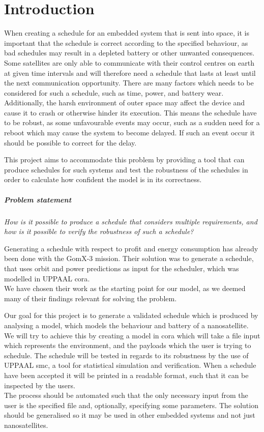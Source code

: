 \chapter{Introduction}\label{cha:intro}
When creating a schedule for an embedded system that is sent into space, it is important that the schedule is correct according to the specified behaviour, as bad schedules may result in a depleted battery or other unwanted consequences. 
Some satellites are only able to communicate with their control centres on earth at given time intervals and will therefore need a schedule that lasts at least until the next communication opportunity.
There are many factors which needs to be considered for such a schedule, such as time, power, and battery wear. 
Additionally, the harsh environment of outer space may affect the device and cause it to crash or otherwise hinder its execution.
This means the schedule have to be robust, as some unfavourable events may occur, such as a sudden need for a reboot which may cause the system to become delayed. If such an event occur it should be possible to correct for the delay.

This project aims to accommodate this problem by providing a tool that can produce schedules for such systems and test the robustness of the schedules in order to calculate how confident the model is in its correctness.

\paragraph{Problem statement}
\textit{How is it possible to produce a schedule that considers multiple requirements, and how is it possible to verify the robustness of such a schedule?}

Generating a schedule with respect to profit and energy consumption has already been done with the GomX-3 mission\cite{gomx3}. 
Their solution was to generate a schedule, that uses orbit and power predictions as input for the scheduler, which was modelled in UPPAAL \gls{cora}.\\
We have chosen their work as the starting point for our model, as we deemed many of their findings relevant for solving the problem.

Our goal for this project is to generate a validated schedule which is produced by analysing a model, which models the behaviour and battery of a nanosatellite. \\
We will try to achieve this by creating a model in \gls{cora} which will take a file input which represents the environment, and the payloads which the user is trying to schedule.
The schedule will be tested in regards to its robustness by the use of UPPAAL \gls{smc}, a tool for statistical simulation and verification. 
When a schedule have been accepted it will be printed in a readable format, such that it can be inspected by the users. \\
The process should be automated such that the only necessary input from the user is the specified file and, optionally, specifying some parameters. 
The solution should be generalised so it may be used in other embedded systems and not just nanosatellites.


